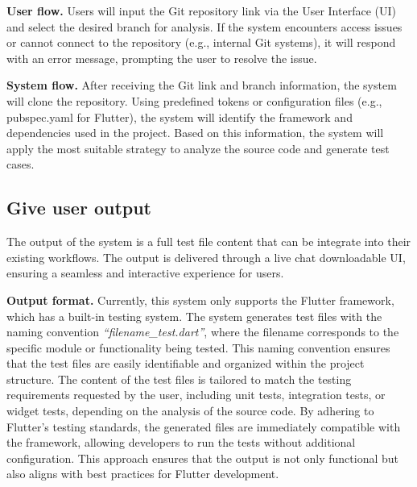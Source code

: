 \hspace{0.5cm}\textbf{User flow.}	Users will input the Git repository link via the User Interface (UI) and select the desired branch for analysis. If the system encounters access issues or cannot connect to the repository (e.g., internal Git systems), it will respond with an error message, prompting the user to resolve the issue.

\hspace{0.5cm}\textbf{System flow.}    After receiving the Git link and branch information, the system will clone the repository. Using predefined tokens or configuration files (e.g., pubspec.yaml for Flutter), the system will identify the framework and dependencies used in the project. Based on this information, the system will apply the most suitable strategy to analyze the source code and generate test cases.

\subsection{Give user output}

\hspace{0.5cm}The output of the system is a full test file content that can be integrate into their existing workflows. The output is delivered through a live chat downloadable UI, ensuring a seamless and interactive experience for users.

\hspace{0.5cm}\textbf{Output format.} Currently, this system only supports the Flutter framework, which has a built-in testing system. The system generates test files with the naming convention \textit{“filename\_test.dart”}, where the filename corresponds to the specific module or functionality being tested. This naming convention ensures that the test files are easily identifiable and organized within the project structure. The content of the test files is tailored to match the testing requirements requested by the user, including unit tests, integration tests, or widget tests, depending on the analysis of the source code. By adhering to Flutter's testing standards, the generated files are immediately compatible with the framework, allowing developers to run the tests without additional configuration. This approach ensures that the output is not only functional but also aligns with best practices for Flutter development.

